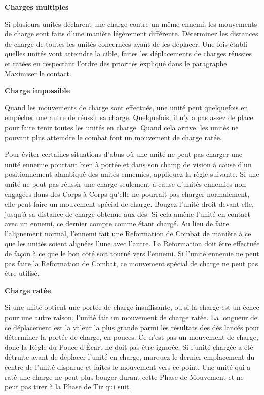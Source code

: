 \noindent\textbf{Charges multiples}

Si plusieurs unités déclarent une charge contre un même ennemi, les mouvements de charge sont faits d'une manière légèrement différente. Déterminez les distances de charge de toutes les unités concernées avant de les déplacer. Une fois établi quelles unités vont atteindre la cible, faites les déplacements de charges réussies et ratées en respectant l'ordre des priorités expliqué dans le paragraphe Maximiser le contact.

\noindent\textbf{Charge impossible}

Quand les mouvements de charge sont effectués, une unité peut quelquefois en empêcher une autre de réussir sa charge. Quelquefois, il n'y a pas assez de place pour faire tenir toutes les unités en charge. Quand cela arrive, les unités ne pouvant plus atteindre le combat font un mouvement de charge ratée.

\noindent\textbf{}

Pour éviter certaines situations d'abus où une unité ne peut pas charger une unité ennemie pourtant bien à portée et dans son champ de vision à cause d'un positionnement alambiqué des unités ennemies, appliquez la règle suivante. Si une unité ne peut pas réussir une charge seulement à cause d'unités ennemies non engagées dans des Corps à Corps qu'elle ne pourrait pas charger normalement, elle peut faire un mouvement spécial de charge. Bougez l'unité droit devant elle, jusqu'à sa distance de charge obtenue aux dés. Si cela amène l'unité en contact avec un ennemi, ce dernier compte comme étant chargé. Au lieu de faire l'alignement normal, l'ennemi fait une Reformation de Combat de manière à ce que les unités soient alignées l'une avec l'autre. La Reformation doit être effectuée de façon à ce que le bon côté soit tourné vers l'ennemi. Si l'unité ennemie ne peut pas faire la Reformation de Combat, ce mouvement spécial de charge ne peut pas être utilisé.

\noindent\textbf{Charge ratée}

Si une unité obtient une portée de charge insuffisante, ou si la charge est un échec pour une autre raison, l'unité fait un mouvement de charge ratée. La longueur de ce déplacement est la valeur la plus grande parmi les résultats des dés lancés pour déterminer la portée de charge, en pouces.  Ce n'est pas un mouvement de charge, donc la Règle du Pouce d'Écart ne doit pas être ignorée. Si l'unité chargée a été détruite avant de déplacer l'unité en charge, marquez le dernier emplacement du centre de l'unité disparue et faites le mouvement vers ce point. Une unité qui a raté une charge ne peut plus bouger durant cette Phase de Mouvement et ne peut pas tirer à la Phase de Tir qui suit.

